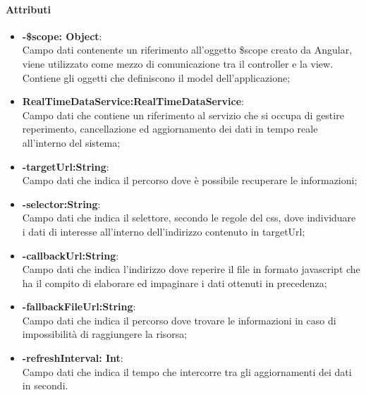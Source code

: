 \paragraph{Attributi}
\begin{itemize}
	\item \textbf{-\$scope: Object}:\\
	Campo dati contenente un riferimento all'oggetto \$scope creato da Angular, viene utilizzato come mezzo di comunicazione tra il controller e la view. Contiene gli oggetti che definiscono il model dell'applicazione;
	\item \textbf{RealTimeDataService:RealTimeDataService}:\\
	Campo dati che contiene un riferimento al servizio che si occupa di gestire reperimento, cancellazione ed aggiornamento dei dati in tempo reale all'interno del sistema;
	\item \textbf{-targetUrl:String}:\\
	Campo dati che indica il percorso dove è possibile recuperare le informazioni;
	\item \textbf{-selector:String}:\\
	Campo dati che indica il selettore, secondo le regole del css, dove individuare i dati di interesse all'interno dell'indirizzo contenuto in targetUrl;
	\item \textbf{-callbackUrl:String}:\\
	Campo dati che indica l'indirizzo dove reperire il file in formato javascript che ha il compito di elaborare ed impaginare i dati ottenuti in precedenza;
	\item \textbf{-fallbackFileUrl:String}:\\
	Campo dati che indica il percorso dove trovare le informazioni in caso di impossibilità di raggiungere la risorsa;
	\item \textbf{-refreshInterval: Int}:\\
	Campo dati che indica il tempo che intercorre tra gli aggiornamenti dei dati in secondi.
	
\end{itemize}

